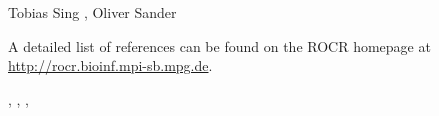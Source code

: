 \begin{Author}\relax
Tobias Sing ,
Oliver Sander 
\end{Author}
\begin{References}\relax
A detailed list of references can be found on the ROCR
homepage at \url{http://rocr.bioinf.mpi-sb.mpg.de}.
\end{References}
\begin{SeeAlso}\relax
{}, ,
, 
\end{SeeAlso}

